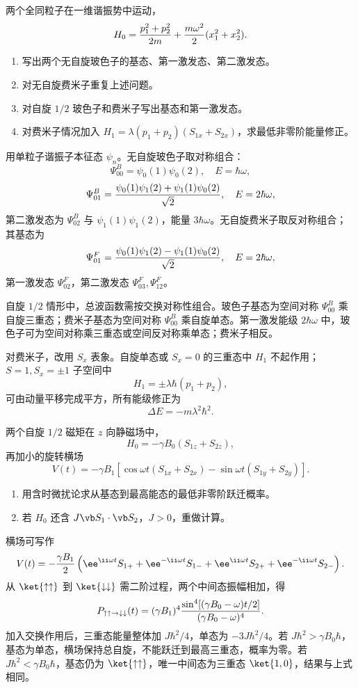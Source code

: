 \begin{question}
两个全同粒子在一维谐振势中运动，
\[
  H_0={p_1^2+p_2^2\over2m}+{m\omega^2\over2}(x_1^2+x_2^2).
\]
\begin{enumerate}
  \item 写出两个无自旋玻色子的基态、第一激发态、第二激发态。
  \item 对无自旋费米子重复上述问题。
  \item 对自旋 $1/2$ 玻色子和费米子写出基态和第一激发态。
  \item 对费米子情况加入 $H_1=\lambda(p_1+p_2)(S_{1x}+S_{2x})$，求最低非零阶能量修正。
\end{enumerate}
\begin{solution}
用单粒子谐振子本征态 $\psi_n$。无自旋玻色子取对称组合：
\[
  \Psi_{00}^{B}=\psi_0(1)\psi_0(2),\quad E=\hbar\omega,
\]
\[
  \Psi_{01}^{B}={\psi_0(1)\psi_1(2)+\psi_1(1)\psi_0(2)\over\sqrt2},\quad E=2\hbar\omega,
\]
第二激发态为 $\Psi_{02}^B$ 与 $\psi_1(1)\psi_1(2)$，能量 $3\hbar\omega$。无自旋费米子取反对称组合；其基态为
\[
  \Psi_{01}^{F}={\psi_0(1)\psi_1(2)-\psi_1(1)\psi_0(2)\over\sqrt2},\quad E=2\hbar\omega,
\]
第一激发态 $\Psi_{02}^{F}$，第二激发态 $\Psi_{03}^{F},\Psi_{12}^{F}$。

自旋 $1/2$ 情形中，总波函数需按交换对称性组合。玻色子基态为空间对称 $\Psi_{00}^{B}$ 乘自旋三重态；费米子基态为空间对称 $\Psi_{00}^{B}$ 乘自旋单态。第一激发能级 $2\hbar\omega$ 中，玻色子可为空间对称乘三重态或空间反对称乘单态；费米子相反。

对费米子，改用 $S_x$ 表象。自旋单态或 $S_x=0$ 的三重态中 $H_1$ 不起作用；$S=1,S_x=\pm1$ 子空间中
\[
  H_1=\pm\lambda\hbar(p_1+p_2),
\]
可由动量平移完成平方，所有能级修正为
\[
  \Delta E=-m\lambda^2\hbar^2.
\]
\end{solution}
\end{question}

\begin{question}
两个自旋 $1/2$ 磁矩在 $z$ 向静磁场中，
\[
  H_0=-\gamma B_0(S_{1z}+S_{2z}),
\]
再加小的旋转横场
\[
  V(t)=-\gamma B_1[\cos\omega t(S_{1x}+S_{2x})-\sin\omega t(S_{1y}+S_{2y})].
\]
\begin{enumerate}
  \item 用含时微扰论求从基态到最高能态的最低非零阶跃迁概率。
  \item 若 $H_0$ 还含 $J\vb S_1\cdot\vb S_2$，$J>0$，重做计算。
\end{enumerate}
\begin{solution}
横场可写作
\[
  V(t)=-{\gamma B_1\over2}\left(\ee^{\ii\omega t}S_{1+}
  +\ee^{-\ii\omega t}S_{1-}+\ee^{\ii\omega t}S_{2+}
  +\ee^{-\ii\omega t}S_{2-}\right).
\]
从 $\ket{\uparrow\uparrow}$ 到 $\ket{\downarrow\downarrow}$ 需二阶过程，两个中间态振幅相加，得
\[
  P_{\uparrow\uparrow\to\downarrow\downarrow}(t)
  =(\gamma B_1)^4{\sin^4[(\gamma B_0-\omega)t/2]\over(\gamma B_0-\omega)^4}.
\]
加入交换作用后，三重态能量整体加 $J\hbar^2/4$，单态为 $-3J\hbar^2/4$。若 $J\hbar^2>\gamma B_0\hbar$，基态为单态，横场保持总自旋，不能跃迁到最高三重态，概率为零。若 $J\hbar^2<\gamma B_0\hbar$，基态仍为 $\ket{\uparrow\uparrow}$，唯一中间态为三重态 $\ket{1,0}$，结果与上式相同。
\end{solution}
\end{question}
